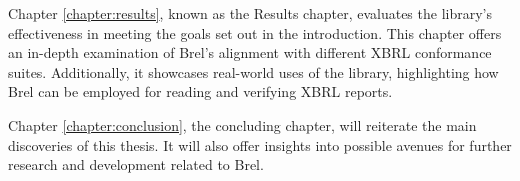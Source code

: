 
Chapter \ref{chapter:results}, known as the Results chapter, 
evaluates the library's effectiveness in meeting the goals set out in the introduction. 
This chapter offers an in-depth examination of Brel's alignment with different XBRL conformance suites. 
Additionally, it showcases real-world uses of the library, 
highlighting how Brel can be employed for reading and verifying XBRL reports.

Chapter \ref{chapter:conclusion}, the concluding chapter,
will reiterate the main discoveries of this thesis.
It will also offer insights into possible avenues for further research and development related to Brel.